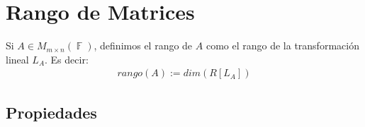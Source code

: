 \documentclass[12pt, fleqn]{report}                             %
\theoremstyle{break}                                            %
\DeclareMathOperator \GenericField {\mathbb{F}}                 %
\begin{document}
        \section{Rango de Matrices}

            Si $A \in M_{m \times n}(\GenericField)$, definimos el rango de $A$
            como el rango de la transformación lineal $L_A$.
            Es decir:
            \begin{align*}
                rango(A) := dim(R[L_A])
            \end{align*}


            \subsection{Propiedades}
\end{document}

